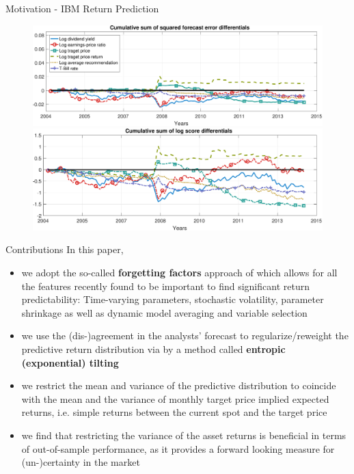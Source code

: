 \documentclass[9pt,xcolor=x11names,compress]{beamer}
\newcommand{\bbtext}[1]{\textcolor{dblue}{\textbf{#1}}}
\let\oldcite=\cite
\renewcommand{\cite}[1]{\textcolor{dblue}{\oldcite{#1}}}
\theoremstyle{standard}
\theoremstyle{notes}
\begin{document}
\begin{frame}{Motivation - IBM Return Prediction}
	\begin{figure}
		\centering
		\includegraphics[width=1\linewidth]{../../Tex/plots/IBM_CSSED_plot}\\
		\includegraphics[width=1\linewidth]{../../Tex/plots/IBM_CLSD_plot}\\
		\label{fig:ibmpredplot}
	\end{figure}
\end{frame}

\begin{frame}{Contributions}
	In this paper, 
	\begin{itemize}
		\item we adopt the so-called \bbtext{forgetting factors} approach of \cite{koop2013} which allows for all the features recently found to be important to find significant return predictability: Time-varying parameters, stochastic volatility, parameter shrinkage as well as dynamic model averaging and variable selection
		\pause
		\item we use the (dis-)agreement in the analysts' forecast to regularize/reweight the predictive return distribution via by a method called \bbtext{entropic (exponential) tilting}
		\pause
		\item we restrict the mean and variance of the predictive distribution to coincide with the mean and the variance of monthly target price implied expected returns, i.e. simple returns between the current spot and the target price
		\pause
		\item we find that restricting the variance of the asset returns is beneficial in terms of out-of-sample performance, as it provides a forward looking measure for (un-)certainty in the market
	\end{itemize}
\end{frame}
\end{document}
